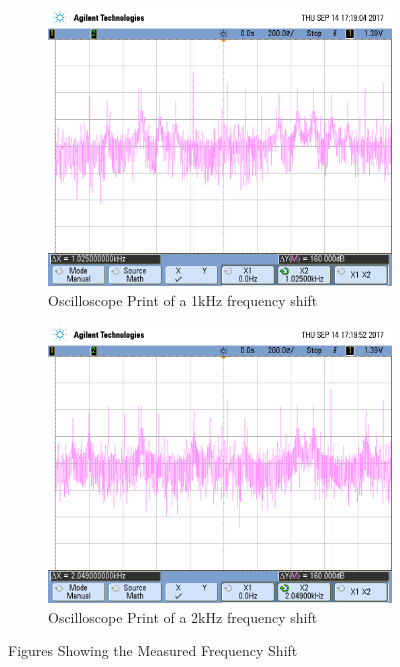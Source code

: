 	\begin{figure}[h!]
	\centering
	\begin{subfigure}{0.48\linewidth}
		\centering
		\includegraphics[width=.9\linewidth]{img/scope_3}
		\caption{Oscilloscope Print of a 1kHz frequency shift }
		\label{fig:1khz}
	\end{subfigure}%
	\begin{subfigure}{0.48\linewidth}
		\centering
		\includegraphics[width=.9\linewidth]{img/scope_4}
		\caption{Oscilloscope Print of a 2kHz frequency shift }
		\label{fig:2khz}
	\end{subfigure}
	\caption{Figures Showing the Measured Frequency Shift}
	\label{fig:2freq}
\end{figure}


